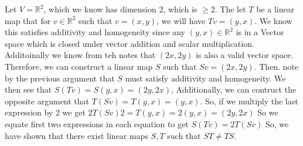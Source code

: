 \documentclass[10pt, twocolumn]{article}
\newcommand{\R}{\mathbb{R}}
\begin{document}
\begin{q}[14]
	Let $ V = \R^2 $, which we know has dimension 2, which is $ \geq 2 $. 
	The let $ T $ be a linear map that for $ v \in \R^2 $ such that $ v = (x, y)$, 
	we will have $ Tv = (y, x) $. 
	We know this satisfies additivity and homogeneity since any $ (y, x) \in \R^2 $ is in a Vector space which is closed under vector addition and scalar multiplication.
	Additoinally we know from teh notes that $ (2x, 2y) $ is also a valid vector space. 
	Therefore, we can construct a linear map $ S $
	such that $ Sv = (2x, 2y) $. 
	Then. note by the previous argument that $S$ must satisfy additivity and homogeneity. 
	We then see that $ S(Tv) = S(y, x) = (2y, 2x) $, 
	Additionally, we can contruct the opposite argument that 
	$ T(Sv) = T(y, x) = (y, x)$. 
	So, if we multiply the last expression by 2 we get
	$ 2T(Sv) 2= T(y, x) = 2(y, x) = (2y, 2x) $
	So we equate first two expressions in each equation to get 
	$ S(Tv) = 2T(Sv) $ 
	So, we have shown that there exist linear maps $ S, T $ such that $ ST \neq TS $. 
\end{q}
\end{document}
